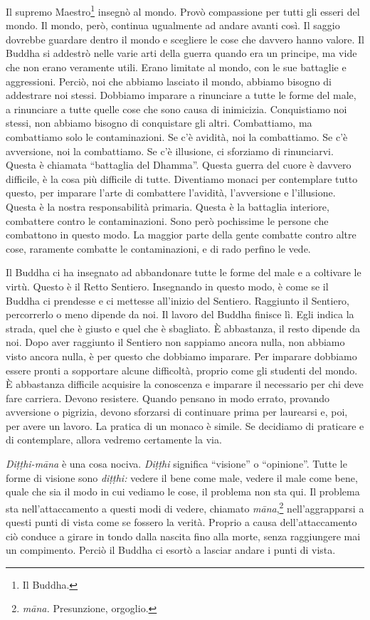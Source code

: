 Il supremo Maestro\footnote{Il Buddha.} insegnò al mondo. Provò
compassione per tutti gli esseri del mondo. Il mondo, però, continua
ugualmente ad andare avanti così. Il saggio dovrebbe guardare dentro il
mondo e scegliere le cose che davvero hanno valore. Il Buddha si
addestrò nelle varie arti della guerra quando era un principe, ma vide
che non erano veramente utili. Erano limitate al mondo, con le sue
battaglie e aggressioni. Perciò, noi che abbiamo lasciato il mondo,
abbiamo bisogno di addestrare noi stessi. Dobbiamo imparare a rinunciare
a tutte le forme del male, a rinunciare a tutte quelle cose che sono
causa di inimicizia. Conquistiamo noi stessi, non abbiamo bisogno di
conquistare gli altri. Combattiamo, ma combattiamo solo le
contaminazioni. Se c'è avidità, noi la combattiamo. Se c'è avversione,
noi la combattiamo. Se c'è illusione, ci sforziamo di rinunciarvi.
Questa è chiamata ``battaglia del Dhamma''. Questa guerra del cuore è
davvero difficile, è la cosa più difficile di tutte. Diventiamo monaci
per contemplare tutto questo, per imparare l'arte di combattere
l'avidità, l'avversione e l'illusione. Questa è la nostra responsabilità
primaria. Questa è la battaglia interiore, combattere contro le
contaminazioni. Sono però pochissime le persone che combattono in questo
modo. La maggior parte della gente combatte contro altre cose, raramente
combatte le contaminazioni, e di rado perfino le vede.

Il Buddha ci ha insegnato ad abbandonare tutte le forme del male e a
coltivare le virtù. Questo è il Retto Sentiero. Insegnando in questo
modo, è come se il Buddha ci prendesse e ci mettesse all'inizio del
Sentiero. Raggiunto il Sentiero, percorrerlo o meno dipende da noi. Il
lavoro del Buddha finisce lì. Egli indica la strada, quel che è giusto e
quel che è sbagliato. È abbastanza, il resto dipende da noi. Dopo aver
raggiunto il Sentiero non sappiamo ancora nulla, non abbiamo visto
ancora nulla, è per questo che dobbiamo imparare. Per imparare dobbiamo
essere pronti a sopportare alcune difficoltà, proprio come gli studenti
del mondo. È abbastanza difficile acquisire la conoscenza e imparare il
necessario per chi deve fare carriera. Devono resistere. Quando pensano
in modo errato, provando avversione o pigrizia, devono sforzarsi di
continuare prima per laurearsi e, poi, per avere un lavoro. La pratica
di un monaco è simile. Se decidiamo di praticare e di contemplare,
allora vedremo certamente la via.

\emph{Diṭṭhi-māna} è una cosa nociva. \emph{Diṭṭhi} significa
``visione'' o ``opinione''. Tutte le forme di visione sono
\emph{diṭṭhi:} vedere il bene come male, vedere il male come bene, quale
che sia il modo in cui vediamo le cose, il problema non sta qui. Il
problema sta nell'attaccamento a questi modi di vedere, chiamato
\emph{māna},\footnote{\emph{māna.} Presunzione, orgoglio.}
nell'aggrapparsi a questi punti di vista come se fossero la verità.
Proprio a causa dell'attaccamento ciò conduce a girare in tondo dalla
nascita fino alla morte, senza raggiungere mai un compimento. Perciò il
Buddha ci esortò a lasciar andare i punti di vista.

